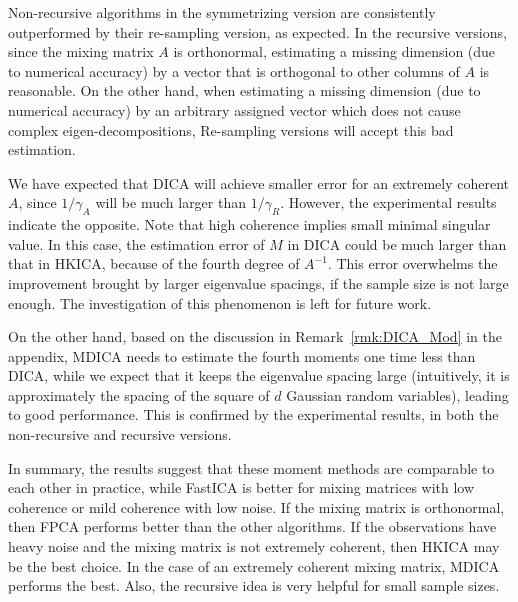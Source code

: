 \documentclass{article}
\theoremstyle{definition}
\begin{document}
Non-recursive algorithms in the symmetrizing version are consistently outperformed by their re-sampling version, as expected. 
In the recursive versions, since the mixing matrix $A$ is orthonormal, estimating a missing dimension (due to numerical accuracy) by a vector that is orthogonal to other columns of $A$ is reasonable. 
On the other hand, when estimating a missing dimension (due to numerical accuracy) by an arbitrary assigned vector which does not cause complex eigen-decompositions, Re-sampling versions will accept this bad estimation.
\fi

We have expected that DICA will achieve smaller error for an extremely coherent $A$, since $1/\gamma_A$ will be much larger than $1/\gamma_R$. 
However, the experimental results indicate the opposite. 
Note that high coherence implies small minimal singular value.
In this case, the estimation error of $M$ in DICA could be much larger than that in HKICA, because of the fourth degree of $A^{-1}$.
This error overwhelms the improvement brought by larger eigenvalue
spacings, if the sample size is not large enough.
The investigation of this phenomenon is left for future work.

On the other hand, based on the discussion in Remark~\ref{rmk:DICA_Mod} in the appendix, 
MDICA needs to estimate the fourth moments one time less than
DICA, while we expect that it keeps the eigenvalue spacing large
(intuitively, it is approximately the spacing of the square of $d$ Gaussian random variables), leading to good performance.
This is confirmed by the experimental results, in both the non-recursive and recursive versions.

In summary, the results suggest that these moment methods are comparable to each other in practice,
while FastICA  is better for mixing matrices with low coherence or mild coherence with low noise.
If the mixing matrix is orthonormal, then FPCA performs better than
the other algorithms.
If the observations have heavy noise and the mixing matrix is not extremely coherent, then HKICA may be the best choice.
In the case of an extremely coherent mixing matrix, MDICA performs the
best. Also, the recursive idea is very helpful for small sample sizes.





\newpage 




\end{document}
